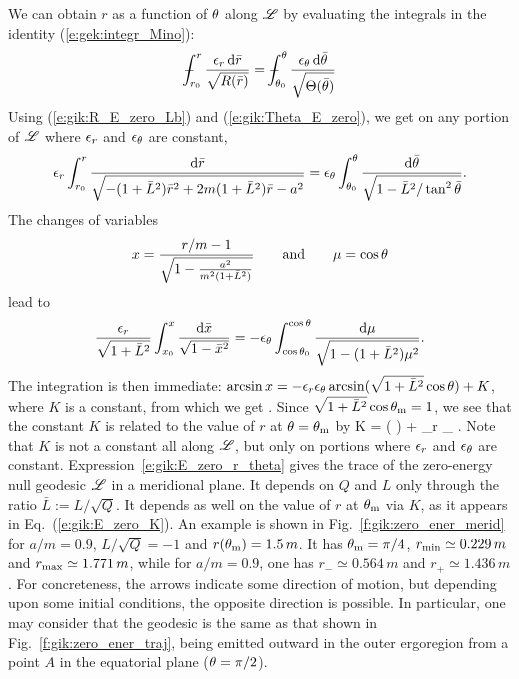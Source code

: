 We can obtain $r$ as a function of $\theta$ along $\mathscr{L}$ by evaluating the integrals
in the identity (\ref{e:gek:integr_Mino}):
\[
    \dashint_{r_0}^r \frac{\eps_r \, \D \bar{r}}{\sqrt{R(\bar{r})}}
   = \dashint_{\th_0}^\th \frac{\eps_\th \, \D \bar{\th}}{\sqrt{\Theta(\bar{\th})}}
\]
Using (\ref{e:gik:R_E_zero_Lb}) and (\ref{e:gik:Theta_E_zero}), we get on
any portion of $\mathscr{L}$ where $\epsilon_r$ and $\epsilon_\theta$ are constant,
\[
    \epsilon_r \int_{r_0}^r
    \frac{\mathrm{d} \bar{r}}{\sqrt{- (1 + \bar{L}^2) \bar{r}^2 + 2m (1 + \bar{L}^2) \bar{r} - a^2}}
    = \epsilon_\theta \int_{\theta_0}^\theta \frac{\mathrm{d} \bar{\theta}}{\sqrt{1 - \bar{L}^2/\tan^2\bar{\theta}}} .
\]
The changes of variables
\[
    x = \frac{r/m - 1}{\sqrt{1 - \frac{a^2}{m^2(1 + \bar{L}^2)}}}
    \qquad\mbox{and}\qquad
    \mu = \cos\theta
\]
lead to
\[
   \frac{\epsilon_r}{\sqrt{1 + \bar{L}^2}} \int_{x_0}^x \frac{\mathrm{d}\bar{x}}{\sqrt{1 - \bar{x}^2}}
   = - \epsilon_\theta \int_{\cos\theta_0}^{\cos\theta} \frac{\mathrm{d}\mu}{\sqrt{1 - (1 + \bar{L}^2)\mu^2}} .
\]
The integration is then immediate:
$\arcsin x = - \epsilon_r \epsilon_\theta \arcsin(\sqrt{1 + \bar{L}^2} \cos\theta) + K$,
where $K$ is a constant, from which we get
\be \label{e:gik:E_zero_r_theta}
   .
\ee
Since $\sqrt{1 + \bar{L}^2} \cos\theta_{\rm m} = 1$, we see that the constant
$K$ is related to the value of $r$ at $\theta = \theta_{\rm m}$ by
\be \label{e:gik:E_zero_K}
    K =  \arcsin \left(  \right)
    + \eps_r \eps_\th {} .
\ee
Note that $K$ is not a constant all along $\mathscr{L}$, but only on portions where
$\epsilon_r$ and $\epsilon_\theta$ are constant.
Expression~\ref{e:gik:E_zero_r_theta} gives the trace of the zero-energy
null geodesic $\mathscr{L}$ in a meridional plane. It depends on $Q$ and $L$ only
through the ratio $\bar{L} := L / \sqrt{Q}$. It depends as well on the value of
$r$ at $\theta_{\rm m}$ via $K$, as it appears in Eq.~(\ref{e:gik:E_zero_K}).
An example is shown in Fig.~\ref{f:gik:zero_ener_merid} for $a/m = 0.9$, $L / \sqrt{Q} = -1$
and $r(\theta_{\rm m}) = 1.5\, m$. It has $\theta_{\rm m} = \pi/4$,
$r_{\rm min} \simeq 0.229\, m$ and $r_{\rm max} \simeq 1.771\, m$,
while for $a/m = 0.9$, one has $r_- \simeq 0.564\, m$ and $r_+ \simeq 1.436\, m$.
For concreteness, the arrows indicate some direction of motion, but depending upon some
initial conditions, the opposite direction is possible.
In particular, one may consider that the geodesic is the same as that shown
in Fig.~\ref{f:gik:zero_ener_traj}, being emitted outward in the outer ergoregion
from a point $A$ in the equatorial plane ($\theta=\pi/2$).

